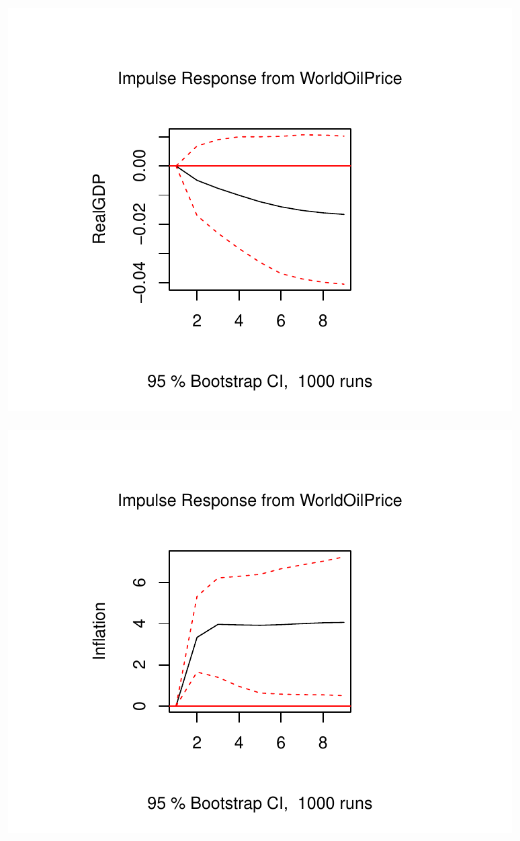 \documentclass[11pt,preprint, authoryear]{elsarticle}
\numberwithin{equation}{section}
\numberwithin{figure}{section}
\numberwithin{table}{section}
\begin{document}
\begin{center}\includegraphics{README_files/figure-latex/unnamed-chunk-5-3} \end{center}

\begin{center}\includegraphics{README_files/figure-latex/unnamed-chunk-5-4} \end{center}
\end{document}
